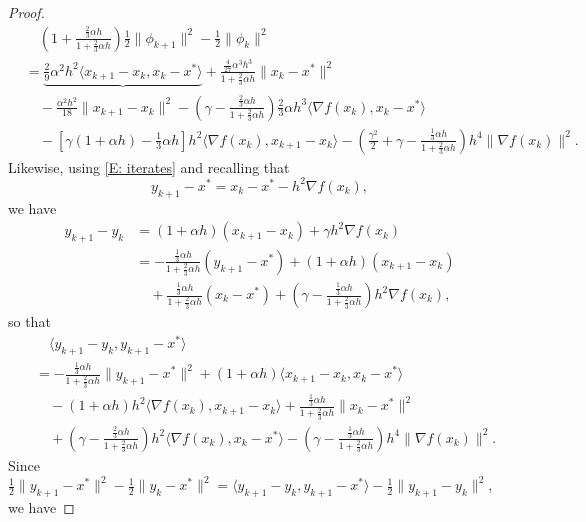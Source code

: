 \documentclass[pdflatex,sn-mathphys-num]{sn-jnl}
\theoremstyle{thmstyleone}
\theoremstyle{thmstyletwo}
\theoremstyle{thmstylethree}
\begin{document}
\begin{appendices}
\begin{proof}
\begin{equation}\label{E: phi_k_diff_SC_TMM}
\begin{aligned}
&\quad \left( 1 + \frac{\frac{2}{3}\alpha h}{1 + \frac{2}{3}\alpha h} \right)\frac{1}{2}\| \phi_{k+1} \|^2 - \frac{1}{2}\| \phi_k \|^2\\
&= \underbrace{ \frac{2}{9}\alpha^2 h^2\langle x_{k+1}-x_k, x_k - x^* \rangle }
   + \frac{\frac{4}{27}\alpha^3 h^3}{1+\frac{2}{3}\alpha h}\| x_k - x^* \|^2 \\
&\quad - \frac{\alpha^2 h^2}{18}\| x_{k+1}-x_k \|^2 
   - \left( \gamma - \frac{\frac{2}{3}\alpha h}{1+\frac{2}{3}\alpha h} \right)\frac{2}{3}\alpha h^3\langle \nabla f(x_k), x_k-x^* \rangle \\
&\quad - \left[ \gamma ( 1 + \alpha h ) - \frac{1}{3}\alpha h \right] h^2  \langle \nabla f(x_k),x_{k+1}-x_k \rangle 
 - \left( \frac{\gamma^2}{2} + \gamma - \frac{ \frac{1}{3}\alpha h }{ 1 + \frac{2}{3}\alpha h } \right) h^4 \| \nabla f(x_k) \|^2.
\end{aligned}
\end{equation}
Likewise, using \eqref{E: iterates} and recalling that
$$ y_{k+1}-x^* = x_k - x^* - h^2\nabla f(x_k), $$
we have
\begin{align*}
y_{k+1} - y_k
&= (1+\alpha h)(x_{k+1}-x_k) + \gamma h^2 \nabla f(x_k) \\
&= -\frac{\frac{1}{3}\alpha h}{1 + \frac{2}{3}\alpha h}(y_{k+1}-x^*)
   + (1+\alpha h)(x_{k+1}-x_k) \\ 
&\quad + \frac{\frac{1}{3}\alpha h}{1 + \frac{2}{3}\alpha h}(x_k - x^*) 
   + \left( \gamma - \frac{\frac{1}{3}\alpha h}{1 + \frac{2}{3}\alpha h} \right) h^2 \nabla f(x_k), 
\end{align*}
so that
\begin{align*}
&\quad \langle y_{k+1}-y_k, y_{k+1}-x^* \rangle \\
&= -\frac{\frac{1}{3}\alpha h}{1 + \frac{2}{3}\alpha h}\| y_{k+1}-x^* \|^2
  + (1+\alpha h)\langle x_{k+1}-x_k, x_k - x^* \rangle\\
&\quad - (1+\alpha h)h^2 \langle \nabla f(x_k), x_{k+1}-x_k \rangle
  + \frac{\frac{1}{3}\alpha h}{1 + \frac{2}{3}\alpha h}\| x_k - x^* \|^2 \\
&\quad + \left( \gamma - \frac{\frac{2}{3}\alpha h}{1 + \frac{2}{3}\alpha h} \right) h^2 \langle \nabla f(x_k), x_k - x^* \rangle 
  - \left( \gamma - \frac{\frac{1}{3}\alpha h}{1 + \frac{2}{3}\alpha h} \right) h^4 \| \nabla f(x_k) \|^2.
\end{align*}
Since $\frac{1}{2}\| y_{k+1}-x^* \|^2 - \frac{1}{2}\| y_k-x^* \|^2 = \langle y_{k+1}-y_k, y_{k+1}-x^* \rangle - \frac{1}{2}\| y_{k+1} - y_k \|^2$, we have

\end{proof}
\end{appendices}
\end{document}
